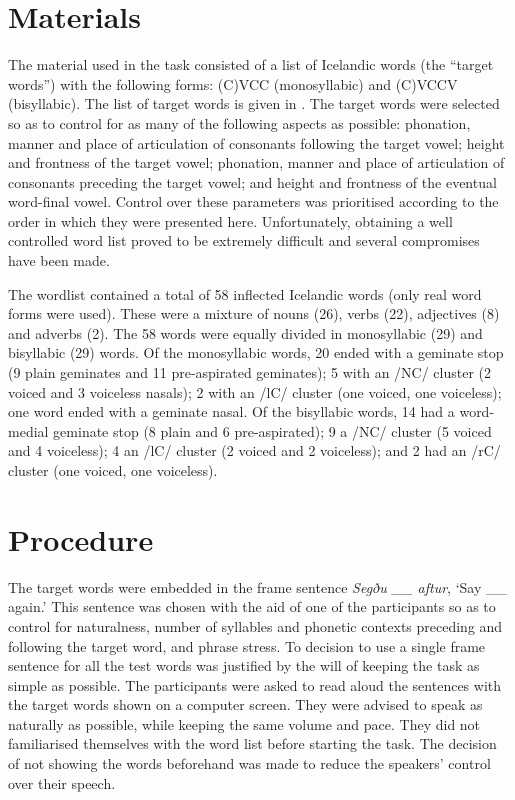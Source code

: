 \documentclass[11pt,a4paper,openany]{memoir}\usepackage[]{graphicx}\usepackage[]{color}
\begin{document}
\section{Materials}

The material used in the task consisted of a list of Icelandic words (the ``target words'') with the following forms: (C)VCC (monosyllabic) and (C)VCCV (bisyllabic).
The list of target words is given in .
The target words were selected so as to control for as many of the following aspects as possible: phonation, manner and place of articulation of consonants following the target vowel; height and frontness of the target vowel; phonation, manner and place of articulation of consonants preceding the target vowel; and height and frontness of the eventual word-final vowel.
Control over these parameters was prioritised according to the order in which they were presented here.
Unfortunately, obtaining a well controlled word list proved to be extremely difficult and several compromises have been made.

The wordlist contained a total of 58 inflected Icelandic words (only real word forms were used).
These were a mixture of nouns (26), verbs (22), adjectives (8) and adverbs (2).
The 58 words were equally divided in monosyllabic (29) and bisyllabic (29) words.
Of the monosyllabic words, 20 ended with a geminate stop (9 plain geminates and 11 pre-aspirated geminates); 5 with an /NC/ cluster (2 voiced and 3 voiceless nasals); 2 with an /lC/ cluster (one voiced, one voiceless); one word ended with a geminate nasal.
Of the bisyllabic words, 14 had a word-medial geminate stop (8 plain and 6 pre-aspirated); 9 a /NC/ cluster (5 voiced and 4 voiceless); 4 an /lC/ cluster (2 voiced and 2 voiceless); and 2 had an /rC/ cluster (one voiced, one voiceless).



\section{Procedure}

The target words were embedded in the frame sentence \textit{Segðu \_\_ aftur}, `Say \_\_ again.'
This sentence was chosen with the aid of one of the participants so as to control for naturalness, number of syllables and phonetic contexts preceding and following the target word, and phrase stress.
To decision to use a single frame sentence for all the test words was justified by the will of keeping the task as simple as possible.
The participants were asked to read aloud the sentences with the target words shown on a computer screen.
They were advised to speak as naturally as possible, while keeping the same volume and pace.
They did not familiarised themselves with the word list before starting the task.
The decision of not showing the words beforehand was made to reduce the speakers' control over their speech.
\end{document}
